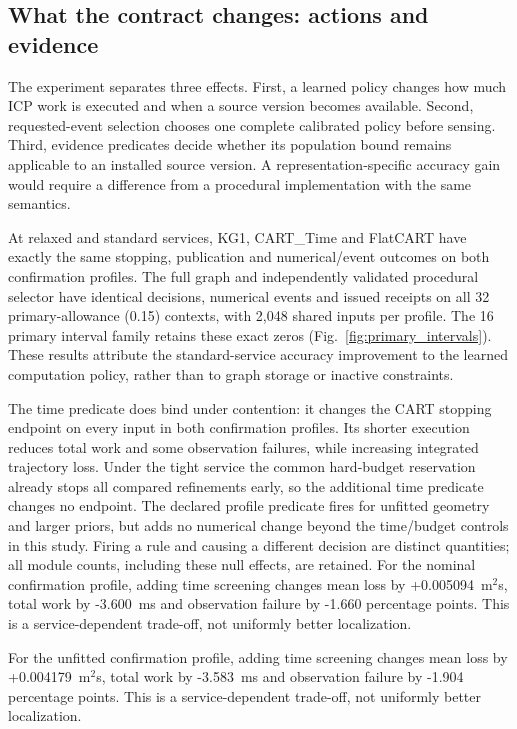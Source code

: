 \subsection{What the contract changes: actions and evidence}
The experiment separates three effects. First, a learned policy changes how much ICP work is executed and when a source version becomes available. Second, requested-event selection chooses one complete calibrated policy before sensing. Third, evidence predicates decide whether its population bound remains applicable to an installed source version. A representation-specific accuracy gain would require a difference from a procedural implementation with the same semantics.

At relaxed and standard services, KG1, CART\_Time and FlatCART have exactly the same stopping, publication and numerical/event outcomes on both confirmation profiles. The full graph and independently validated procedural selector have identical decisions, numerical events and issued receipts on all 32 primary-allowance (0.15) contexts, with 2,048 shared inputs per profile. The 16 primary interval family retains these exact zeros (Fig.~\ref{fig:primary_intervals}). These results attribute the standard-service accuracy improvement to the learned computation policy, rather than to graph storage or inactive constraints.

The time predicate does bind under contention: it changes the CART stopping endpoint on every input in both confirmation profiles. Its shorter execution reduces total work and some observation failures, while increasing integrated trajectory loss. Under the tight service the common hard-budget reservation already stops all compared refinements early, so the additional time predicate changes no endpoint. The declared profile predicate fires for unfitted geometry and larger priors, but adds no numerical change beyond the time/budget controls in this study. Firing a rule and causing a different decision are distinct quantities; all module counts, including these null effects, are retained.
For the nominal confirmation profile, adding time screening changes mean loss by +0.005094~m$^2$s, total work by -3.600~ms and observation failure by -1.660 percentage points. This is a service-dependent trade-off, not uniformly better localization.

For the unfitted confirmation profile, adding time screening changes mean loss by +0.004179~m$^2$s, total work by -3.583~ms and observation failure by -1.904 percentage points. This is a service-dependent trade-off, not uniformly better localization.

